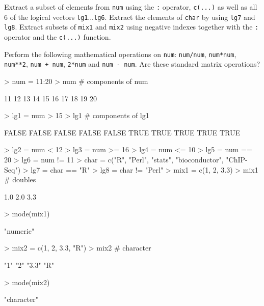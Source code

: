 \documentclass[12pt]{article}
\newcommand{\code}[1]{{\texttt{#1}}}
\begin{document}
Extract a subset of elements from \code{num} using the \code{:} operator, \code{c(...)} as well as all 6 of the logical vectors \code{lg1}...\code{lg6}.  Extract the elements of \code{char} by using \code{lg7} and \code{lg8}.  Extract subsets of \code{mix1} and \code{mix2} using negative indexes together with the \code{:} operator and the \code{c(...)} function.

Perform the following mathematical operations on \code{num}: \code{num/num}, \code{num*num}, \code{num**2}, \code{num + num}, \code{2*num} and \code{num - num}.  Are these standard matrix operations?          


\begin{Schunk}
\begin{Sinput}
> num = 11:20
> num # components of num
\end{Sinput}
\begin{Soutput}
 [1] 11 12 13 14 15 16 17 18 19 20
\end{Soutput}
\begin{Sinput}
> lg1 = num > 15
> lg1 # components of lg1
\end{Sinput}
\begin{Soutput}
 [1] FALSE FALSE FALSE FALSE FALSE  TRUE  TRUE  TRUE  TRUE  TRUE
\end{Soutput}
\begin{Sinput}
> lg2 = num < 12
> lg3 = num >= 16
> lg4 = num <= 10
> lg5 = num == 20
> lg6 = num != 11
> char = c("R", "Perl", "stats", "bioconductor", "ChIP-Seq")
> lg7 = char == "R"
> lg8 = char != "Perl"
> mix1 = c(1, 2, 3.3)
> mix1 # doubles
\end{Sinput}
\begin{Soutput}
[1] 1.0 2.0 3.3
\end{Soutput}
\begin{Sinput}
> mode(mix1)
\end{Sinput}
\begin{Soutput}
[1] "numeric"
\end{Soutput}
\begin{Sinput}
> mix2 = c(1, 2, 3.3, "R") 
> mix2 # character
\end{Sinput}
\begin{Soutput}
[1] "1"   "2"   "3.3" "R"  
\end{Soutput}
\begin{Sinput}
> mode(mix2)
\end{Sinput}
\begin{Soutput}
[1] "character"
\end{Soutput}

\end{Schunk}
\end{document}
